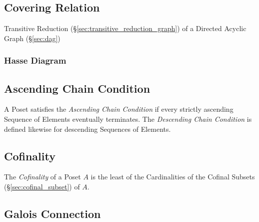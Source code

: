 \subsection{Covering Relation}\label{sec:covering_relation}

Transitive Reduction (\S\ref{sec:transitive_reduction_graph}) of a
Directed Acyclic Graph (\S\ref{sec:dag})



\subsubsection{Hasse Diagram}\label{sec:hasse_diagram}



\subsection{Ascending Chain Condition}\label{sec:ascending_chain}

A Poset satisfies the \emph{Ascending Chain Condition} if every
strictly ascending Sequence of Elements eventually terminates. The
\emph{Descending Chain Condition} is defined likewise for descending
Sequences of Elements.



\subsection{Cofinality}\label{sec:cofinality}

The \emph{Cofinality} of a Poset $A$ is the least of the Cardinalities
of the Cofinal Subsets (\S\ref{sec:cofinal_subset}) of $A$.



\subsection{Galois Connection}\label{sec:galois_connection}

